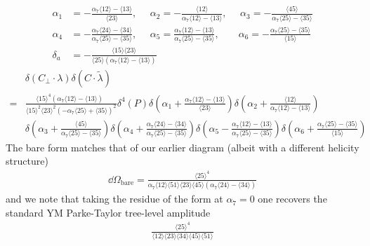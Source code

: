 \documentclass[letter,11pt]{article}
\newcommand{\ab}[1]{\langle #1 \rangle}
\begin{document}
\begin{equation}
	\begin{aligned}
		\alpha_1&=-\frac{
			\alpha_7\ab{12}-\ab{13}
		}{	\ab{23}},~~~~~~
		\alpha_2=-\frac{\ab{12}}{\alpha_7\ab{12}-\ab{13}},~~~~~~
		\alpha_3=-\frac{\ab{45}}{\alpha_7\ab{25}-\ab{35}}\\
		\alpha_4&=-\frac{\alpha_7\ab{24}-\ab{34}}{\alpha_7\ab{25}-\ab{35}}
		,~~~~~~
		\alpha_5=\frac{\alpha_7\ab{12}-\ab{13}}{\alpha_7\ab{25}-\ab{35}}
		,~~~~~~~~\,
		\alpha_6=-\frac{\alpha_7\ab{25}-\ab{35}}{\ab{15}}
		\\
		\delta_a&=-\frac{\ab{15}\ab{23}}{\ab{25}\left(\alpha_7\ab{12}-\ab{13}\right)}
	\end{aligned}
\end{equation}
\begin{equation}
	\begin{aligned}
		&\delta(C_\perp\cdot \lambda)\delta(C\cdot \tilde \lambda)\\
		=&
		\frac{\ab{15}^4\left(\alpha_7\ab{12}-\ab{13}\right)^{\phantom{2}}}{\ab{15}^2\ab{23}^2 \left(-\alpha_7\ab{25}+\ab{35}\right)^2}\delta^4( P)
		\delta\left(\alpha_1+\frac{
			\alpha_7\ab{12}-\ab{13}
		}{	\ab{23}}\right)
		\delta\left(\alpha_2+\frac{\ab{12}}{\alpha_7\ab{12}-\ab{13}}\right)\\&
		\delta\left(\alpha_3+\frac{\ab{45}}{\alpha_7\ab{25}-\ab{35}}\right)
		\delta\left(\alpha_4+\frac{\alpha_7\ab{24}-\ab{34}}{\alpha_7\ab{25}-\ab{35}}\right)
		\delta\left(\alpha_5-\frac{\alpha_7\ab{12}-\ab{13}}{\alpha_7\ab{25}-\ab{35}}\right)
		\delta\left(\alpha_6+\frac{\alpha_7\ab{25}-\ab{35}}{\ab{15}}\right)
	\end{aligned}
\end{equation}
The bare form matches that of our earlier diagram (albeit with a different helicity structure)
\begin{equation}
	\begin{aligned}
		\dd \Omega_{\text{bare}}=	\frac{\ab{25}^4}{\alpha_7 \ab{12}\ab{51}\ab{23}\ab{45}\left(\alpha_7\ab{24}-\ab{34}\right)}
	\end{aligned}
\end{equation}
and we note that taking the residue of the form at $\alpha_7=0$ one recovers the standard YM Parke-Taylor tree-level amplitude
\begin{equation}
	\begin{aligned}
			\frac{\ab{25}^4}{ \ab{12}\ab{23}\ab{34}\ab{45}\ab{51}}
	\end{aligned}
\end{equation}
\end{document}
